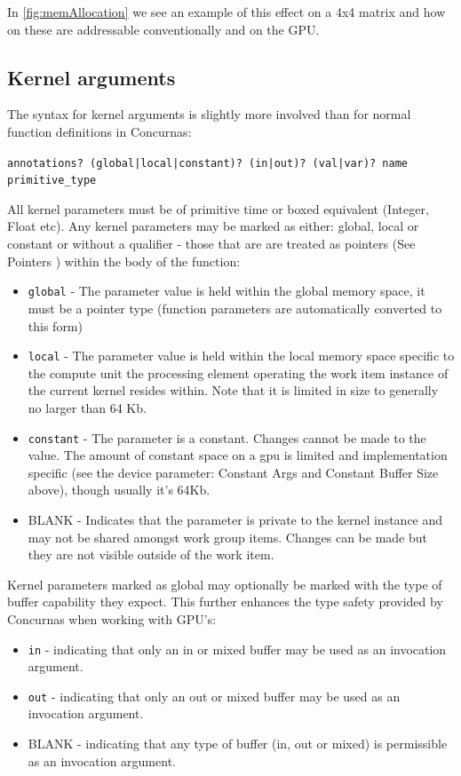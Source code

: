 \documentclass[conc-doc]{subfiles}
\begin{document}
In \ref{fig:memAllocation} we see an example of this effect on a 4x4 matrix and how on these are addressable conventionally and on the GPU.

\subsection{Kernel arguments}
The syntax for kernel arguments is slightly more involved than for normal function definitions in Concurnas:

\begin{center}
	\lstinline{annotations? (global|local|constant)? (in|out)? (val|var)? name primitive_type}
\end{center}

All kernel parameters must be of primitive time or boxed equivalent (Integer, Float etc). Any kernel parameters may be marked as either: global, local or constant or without a qualifier - those that are are treated as pointers (See Pointers ) within the body of the function:

\begin{itemize}
	\item \lstinline{global} - The parameter value is held within the global memory space, it must be a pointer type (function parameters are automatically converted to this form)
	\item \lstinline{local} - The parameter value is held within the local memory space specific to the compute unit the processing element operating the work item instance of the current kernel resides within. Note that it is limited in size to generally no larger than 64 Kb.
	\item \lstinline{constant} - The parameter is a constant. Changes cannot be made to the value. The amount of constant space on a gpu is limited and implementation specific (see the device parameter: Constant Args and Constant Buffer Size above), though usually it's 64Kb.
	\item BLANK - Indicates that the parameter is private to the kernel instance and may not be shared amongst work group items. Changes can be made but they are not visible outside of the work item.
\end{itemize}

Kernel parameters marked as global may optionally be marked with the type of buffer capability they expect. This further enhances the type safety provided by Concurnas when working with GPU's:

\begin{itemize}
	\item \lstinline{in} - indicating that only an in or mixed buffer may be used as an invocation argument.
	\item \lstinline{out} - indicating that only an out or mixed buffer may be used as an invocation argument.
	\item BLANK - indicating that any type of buffer (in, out or mixed) is permissible as an invocation argument.
\end{itemize}
\end{document}
